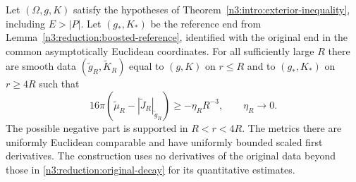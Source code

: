 \begin{proposition}
\label{n3:reduction:annular-replacement}
Let $(\Omega,g,K)$ satisfy the hypotheses of
Theorem~\ref{n3:intro:exterior-inequality}, including $E>|P|$.
Let $(g_*,K_*)$ be the reference end from
Lemma~\ref{n3:reduction:boosted-reference}, identified with the original
end in the common asymptotically Euclidean coordinates.  For all sufficiently
large $R$ there are smooth data $(\widetilde g_R,\widetilde K_R)$ equal to
$(g,K)$ on $r\le R$ and to $(g_*,K_*)$ on $r\ge4R$ such that
\begin{equation}
 \label{n3:reduction:annular-deficit}
 16\pi(\widetilde\mu_R-|\widetilde J_R|_{\widetilde g_R})
       \ge-\eta_RR^{-3},\qquad \eta_R\longrightarrow0.
\end{equation}
The possible negative part is supported in $R<r<4R$.
The metrics there are uniformly Euclidean comparable and have uniformly
bounded scaled first derivatives.  The construction uses no derivatives
of the original data beyond those in
\eqref{n3:reduction:original-decay} for its quantitative estimates.
\end{proposition}

